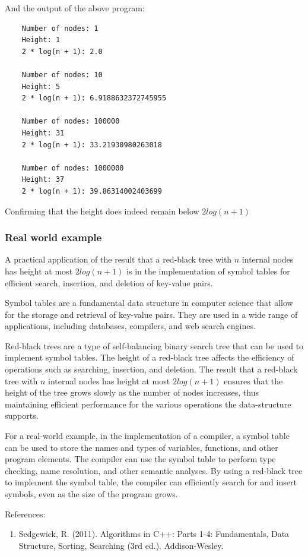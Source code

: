 \documentclass[10pt]{article}
\begin{document}
  And the output of the above program:

  \begin{verbatim}
    Number of nodes: 1
    Height: 1
    2 * log(n + 1): 2.0

    Number of nodes: 10
    Height: 5
    2 * log(n + 1): 6.9188632372745955

    Number of nodes: 100000
    Height: 31
    2 * log(n + 1): 33.21930980263018

    Number of nodes: 1000000
    Height: 37
    2 * log(n + 1): 39.86314002403699
  \end{verbatim}

  \noindent
  Confirming that the height does indeed remain below $2log(n + 1)$

  \subsubsection*{Real world example}


  A practical application of the result that a red-black tree with $n$ internal nodes
  has height at most $2 log(n + 1)$ is in the implementation of symbol tables for
  efficient search, insertion, and deletion of key-value pairs.

  \spacing
  \noindent
  Symbol tables are a fundamental data structure in computer science that allow for
  the storage and retrieval of key-value pairs. They are used in a wide range of
  applications, including databases, compilers, and web search engines.

  \spacing
  \noindent
  Red-black trees are a type of self-balancing binary search tree that can be used
  to implement symbol tables. The height of a red-black tree affects the
  efficiency of operations such as searching, insertion, and deletion. The result
  that a red-black tree with $n$ internal nodes has height at most $2 log(n + 1)$
  ensures that the height of the tree grows slowly as the number of nodes increases,
  thus maintaining efficient performance for the various operations the data-structure
  supports.

  \spacing
  \noindent
  For a real-world example, in the implementation of a compiler, a symbol table
  can be used to store the names and types of variables, functions, and other
  program elements. The compiler can use the symbol table to perform type checking,
  name resolution, and other semantic analyses. By using a red-black tree to
  implement the symbol table, the compiler can efficiently search for and insert
  symbols, even as the size of the program grows.

  \spacing
  \noindent
  References:

  \begin{enumerate}
    \item Sedgewick, R. (2011). Algorithms in C++: Parts 1-4: Fundamentals, Data
      Structure, Sorting, Searching (3rd ed.). Addison-Wesley.
  \end{enumerate}
\end{document}
